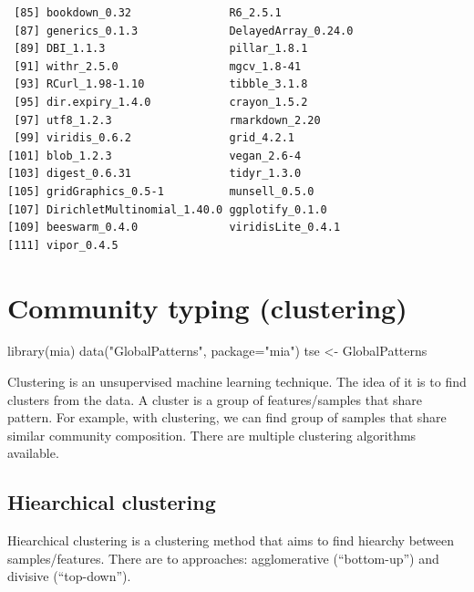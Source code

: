 \documentclass[
]{book}
\newenvironment{Shaded}{\begin{snugshade}}{\end{snugshade}}
\newcommand{\AttributeTok}[1]{\textcolor[rgb]{0.77,0.63,0.00}{#1}}
\newcommand{\FunctionTok}[1]{\textcolor[rgb]{0.00,0.00,0.00}{#1}}
\newcommand{\NormalTok}[1]{#1}
\newcommand{\OtherTok}[1]{\textcolor[rgb]{0.56,0.35,0.01}{#1}}
\newcommand{\StringTok}[1]{\textcolor[rgb]{0.31,0.60,0.02}{#1}}
\begin{document}
\begin{verbatim}
 [85] bookdown_0.32               R6_2.5.1                   
 [87] generics_0.1.3              DelayedArray_0.24.0        
 [89] DBI_1.1.3                   pillar_1.8.1               
 [91] withr_2.5.0                 mgcv_1.8-41                
 [93] RCurl_1.98-1.10             tibble_3.1.8               
 [95] dir.expiry_1.4.0            crayon_1.5.2               
 [97] utf8_1.2.3                  rmarkdown_2.20             
 [99] viridis_0.6.2               grid_4.2.1                 
[101] blob_1.2.3                  vegan_2.6-4                
[103] digest_0.6.31               tidyr_1.3.0                
[105] gridGraphics_0.5-1          munsell_0.5.0              
[107] DirichletMultinomial_1.40.0 ggplotify_0.1.0            
[109] beeswarm_0.4.0              viridisLite_0.4.1          
[111] vipor_0.4.5                
\end{verbatim}

\hypertarget{clustering}{%
\chapter{Community typing (clustering)}\label{clustering}}

\begin{Shaded}
\begin{Highlighting}[]
\FunctionTok{library}\NormalTok{(mia)}
\FunctionTok{data}\NormalTok{(}\StringTok{"GlobalPatterns"}\NormalTok{, }\AttributeTok{package=}\StringTok{"mia"}\NormalTok{)}
\NormalTok{tse }\OtherTok{\textless{}{-}}\NormalTok{ GlobalPatterns}
\end{Highlighting}
\end{Shaded}

Clustering is an unsupervised machine learning technique. The idea of
it is to find clusters from the data. A cluster is a group of
features/samples that share pattern. For example, with clustering, we
can find group of samples that share similar community
composition. There are multiple clustering algorithms available.

\hypertarget{hiearchical-clustering}{%
\section{Hiearchical clustering}\label{hiearchical-clustering}}

Hiearchical clustering is a clustering method that aims to find
hiearchy between samples/features. There are to approaches:
agglomerative (``bottom-up'') and divisive (``top-down'').
\end{document}
